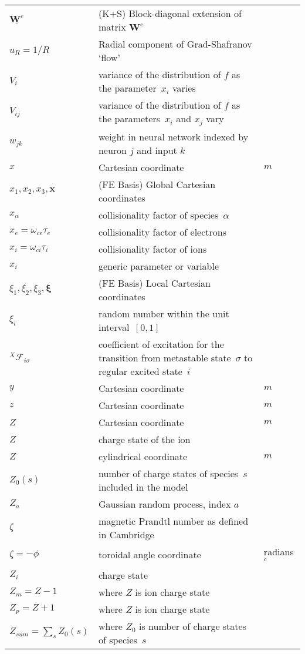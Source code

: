 \begin{longtable}{|p{3.0cm}|p{10.0cm}|p{3.0cm}|}
$\underline{\boldsymbol{W}^e}$ &  (K+S) Block-diagonal extension of matrix $\boldsymbol{W}^e$ & \\
$u_R=1/R$ & Radial component of Grad-Shafranov `flow' & \\
$V_i$ & variance of the distribution of $f$ as the parameter~$x_i$ varies  & \\
$V_{ij}$ & variance of the distribution of $f$ as the parameters~$x_i$ and $x_j$ vary  & \\
$w_{jk}$ & weight in neural network indexed by neuron $j$ and input $k$  & \\
$x$ & Cartesian coordinate  & $m$ \\
$x_1, x_2, x_3, {\mathbf x}$ &  (FE Basis) Global Cartesian coordinates & \\
$x_\alpha$ & collisionality factor of species~$\alpha$ & \\
$x_e = \omega_{ce}\tau_e$ & collisionality factor of electrons & \\
$x_i = \omega_{ci}\tau_i$ & collisionality factor of ions & \\
$x_i$ & generic parameter or variable  & \\ 
$\xi_1, \xi_2, \xi_3, \boldsymbol{\xi}$ &  (FE Basis) Local Cartesian coordinates & \\
$\xi_i$ & random number within the unit interval~$[0,1]$  & \\
$^X\mathcal{F}_{i\sigma}$ & coefficient of excitation for the transition from metastable state~$\sigma$ to regular excited state~$i$  & \\
$y$ & Cartesian coordinate  & $m$ \\
$z$ & Cartesian coordinate  & $m$ \\
$Z$ & Cartesian coordinate  & $m$ \\
$Z$ & charge state of the ion & \\
$Z$ & cylindrical coordinate  & $m$ \\
$Z_0(s)$ & number of charge states of species~$s$ included in the model & \\
$Z_a$ & Gaussian random process, index $a$  & \\
$\zeta$ & magnetic Prandtl number as defined in Cambridge & \\
$\zeta=-\phi$ & toroidal angle coordinate & radians $^c$ \\
$Z_i$ & charge state & \\
$Z_m=Z-1$ & where $Z$ is ion charge state & \\
$Z_p=Z+1$ & where $Z$ is ion charge state & \\
$Z_{sum}=\sum_s Z_0(s)$ & where $Z_0$ is number of charge states of species~$s$ & \\
\hline
\end{longtable}
